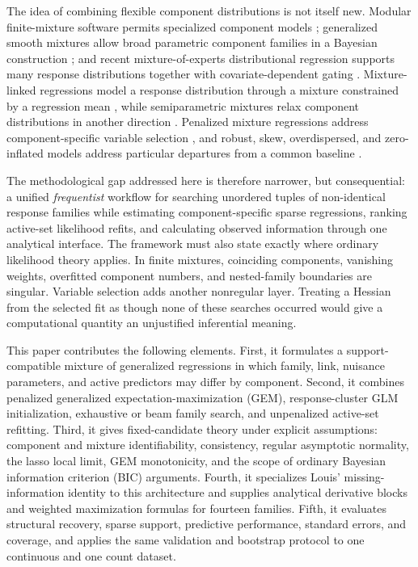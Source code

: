 \documentclass[a4paper,fleqn]{cas-sc}
\begin{document}
The idea of combining flexible component distributions is not itself new. Modular finite-mixture software permits specialized component models \citep{leisch2004flexmix,grun2007fitting}; generalized smooth mixtures allow broad parametric component families in a Bayesian construction \citep{villani2012generalized}; and recent mixture-of-experts distributional regression supports many response distributions together with covariate-dependent gating \citep{gormley2019experts,rugamer2024mixture}. Mixture-linked regressions model a response distribution through a mixture constrained by a regression mean \citep{raim2018extension}, while semiparametric mixtures relax component distributions in another direction \citep{millard2022semiparametric}. Penalized mixture regressions address component-specific variable selection \citep{khalili2007variable,stadler2010l1}, and robust, skew, overdispersed, and zero-inflated models address particular departures from a common baseline \citep{azzalini1985skew,lambert1992zip}.

The methodological gap addressed here is therefore narrower, but consequential: a unified \emph{frequentist} workflow for searching unordered tuples of non-identical response families while estimating component-specific sparse regressions, ranking active-set likelihood refits, and calculating observed information through one analytical interface. The framework must also state exactly where ordinary likelihood theory applies. In finite mixtures, coinciding components, vanishing weights, overfitted component numbers, and nested-family boundaries are singular. Variable selection adds another nonregular layer. Treating a Hessian from the selected fit as though none of these searches occurred would give a computational quantity an unjustified inferential meaning.

This paper contributes the following elements. First, it formulates a support-compatible mixture of generalized regressions in which family, link, nuisance parameters, and active predictors may differ by component. Second, it combines penalized generalized expectation-maximization (GEM), response-cluster GLM initialization, exhaustive or beam family search, and unpenalized active-set refitting. Third, it gives fixed-candidate theory under explicit assumptions: component and mixture identifiability, consistency, regular asymptotic normality, the lasso local limit, GEM monotonicity, and the scope of ordinary Bayesian information criterion (BIC) arguments. Fourth, it specializes Louis' missing-information identity to this architecture and supplies analytical derivative blocks and weighted maximization formulas for fourteen families. Fifth, it evaluates structural recovery, sparse support, predictive performance, standard errors, and coverage, and applies the same validation and bootstrap protocol to one continuous and one count dataset.
\end{document}
